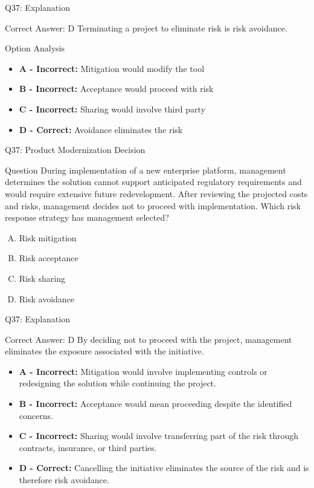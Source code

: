 \documentclass{beamer}
\begin{document}
	\begin{frame}{Q37: Explanation}
		\begin{block}{Correct Answer: D}
			Terminating a project to eliminate risk is risk avoidance.
		\end{block}
		\begin{block}{Option Analysis}
			\begin{itemize}
				\item \textbf{A - Incorrect:} Mitigation would modify the tool
				\item \textbf{B - Incorrect:} Acceptance would proceed with risk
				\item \textbf{C - Incorrect:} Sharing would involve third party
				\item \textbf{D - Correct:} Avoidance eliminates the risk
			\end{itemize}
		\end{block}
	\end{frame}
	
	
	\begin{frame}{Q37: Product Modernization Decision} \begin{block}{Question} During implementation of a new enterprise platform, management determines the solution cannot support anticipated regulatory requirements and would require extensive future redevelopment. After reviewing the projected costs and risks, management decides not to proceed with implementation. Which risk response strategy has management selected? \end{block} \begin{enumerate}[(A)] \item Risk mitigation \item Risk acceptance \item Risk sharing \item Risk avoidance \end{enumerate} \end{frame} \begin{frame}{Q37: Explanation} \begin{block}{Correct Answer: D} By deciding not to proceed with the project, management eliminates the exposure associated with the initiative. \end{block} \begin{itemize} \item \textbf{A - Incorrect:} Mitigation would involve implementing controls or redesigning the solution while continuing the project. \item \textbf{B - Incorrect:} Acceptance would mean proceeding despite the identified concerns. \item \textbf{C - Incorrect:} Sharing would involve transferring part of the risk through contracts, insurance, or third parties. \item \textbf{D - Correct:} Cancelling the initiative eliminates the source of the risk and is therefore risk avoidance. \end{itemize} \end{frame}
	
\end{document}
